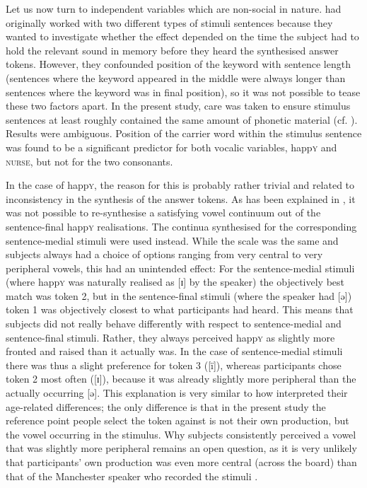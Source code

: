 Let us now turn to independent variables which are non-social in nature.
\textcite{hayetal2006a} had originally worked with two different types of stimuli sentences because they wanted to investigate whether the  effect depended on the time the subject had to hold the relevant sound in memory before they heard the synthesised answer tokens.
However, they confounded position of the keyword with sentence length (sentences where the keyword appeared in the middle were always longer than sentences where the keyword was in final position), so it was not possible to tease these two factors apart.
In the present study, care was taken to ensure stimulus sentences at least roughly contained the same amount of phonetic material (cf. ).
Results were ambiguous.
Position of the carrier word within the stimulus sentence was found to be a significant predictor for both vocalic variables, happ\textsc{y} and \textsc{nurse}, but not for the two consonants.

In the case of happ\textsc{y}, the reason for this is probably rather trivial and related to inconsistency in the synthesis of the answer tokens.
As has been explained in , it was not possible to re-synthesise a satisfying vowel continuum out of the sentence-final happ\textsc{y} realisations.
The continua synthesised for the corresponding sentence-medial stimuli were used instead.
While the scale was the same and subjects always had a choice of options ranging from very central to very peripheral vowels, this had an unintended effect: For the sentence-medial stimuli (where happ\textsc{y} was naturally realised as [ɪ] by the speaker) the objectively best match was token 2, but in the sentence-final stimuli (where the speaker had [ə]) token 1 was objectively closest to what participants had heard.
This means that subjects did not really behave differently with respect to sentence-medial and sentence-final stimuli.
Rather, they always perceived happ\textsc{y} as slightly more fronted and raised than it actually was.
In the case of sentence-medial stimuli there was thus a slight preference for token 3 ([ï]), whereas participants chose token 2 most often ([ɪ]), because it was already slightly more peripheral than the actually occurring [ə].
This explanation is very similar to how \textcite[878--879; see also above]{haydrager2010} interpreted their age-related differences; the only difference is that in the present study the reference point people select the token against is not their own production, but the vowel occurring in the stimulus.
Why subjects consistently perceived a vowel that was slightly more peripheral remains an open question, as it is very unlikely that participants' own production was even more central (across the board) than that of the Manchester speaker who recorded the stimuli \parencite[cf.][878--879]{haydrager2010}.

